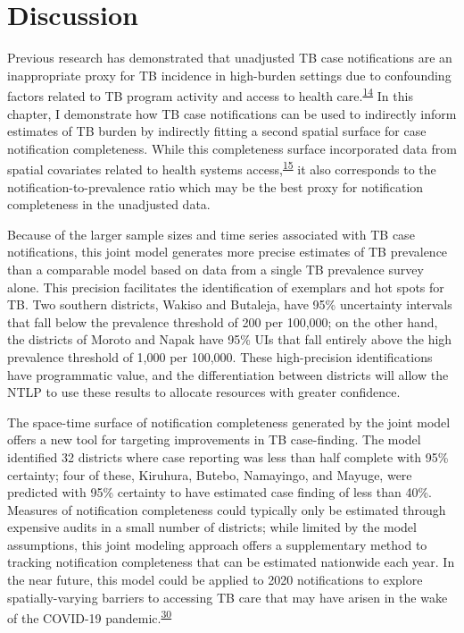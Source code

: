 \documentclass[
]{article}
\begin{document}
\hypertarget{discussion}{%
\section{Discussion}\label{discussion}}

Previous research has demonstrated that unadjusted TB case notifications are an inappropriate proxy for TB incidence in high-burden settings due to confounding factors related to TB program activity and access to health care.\textsuperscript{\protect\hyperlink{ref-Shaweno2018}{14}} In this chapter, I demonstrate how TB case notifications can be used to indirectly inform estimates of TB burden by indirectly fitting a second spatial surface for case notification completeness. While this completeness surface incorporated data from spatial covariates related to health systems access,\textsuperscript{\protect\hyperlink{ref-VanGurp2020}{15}} it also corresponds to the notification-to-prevalence ratio which may be the best proxy for notification completeness in the unadjusted data.

Because of the larger sample sizes and time series associated with TB case notifications, this joint model generates more precise estimates of TB prevalence than a comparable model based on data from a single TB prevalence survey alone. This precision facilitates the identification of exemplars and hot spots for TB. Two southern districts, Wakiso and Butaleja, have 95\% uncertainty intervals that fall below the prevalence threshold of 200 per 100,000; on the other hand, the districts of Moroto and Napak have 95\% UIs that fall entirely above the high prevalence threshold of 1,000 per 100,000. These high-precision identifications have programmatic value, and the differentiation between districts will allow the NTLP to use these results to allocate resources with greater confidence.

The space-time surface of notification completeness generated by the joint model offers a new tool for targeting improvements in TB case-finding. The model identified 32 districts where case reporting was less than half complete with 95\% certainty; four of these, Kiruhura, Butebo, Namayingo, and Mayuge, were predicted with 95\% certainty to have estimated case finding of less than 40\%. Measures of notification completeness could typically only be estimated through expensive audits in a small number of districts; while limited by the model assumptions, this joint modeling approach offers a supplementary method to tracking notification completeness that can be estimated nationwide each year. In the near future, this model could be applied to 2020 notifications to explore spatially-varying barriers to accessing TB care that may have arisen in the wake of the COVID-19 pandemic.\textsuperscript{\protect\hyperlink{ref-Togun2020}{30}}
\end{document}
